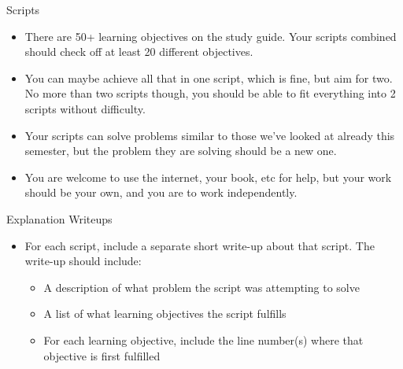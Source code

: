 \documentclass[pdf, aspectratio=169, 12pt]{beamer}
\begin{document}
\begin{frame}{Scripts}
	\begin{itemize}
		\item There are 50+ learning objectives on the study guide. Your scripts combined should check off at least 20 different objectives.
		\item You can maybe achieve all that in one script, which is fine, but aim for two. No more than two scripts though, you should be able to fit everything into 2 scripts without difficulty.
		\item Your scripts can solve problems similar to those we've looked at already this semester, but the problem they are solving should be a new one.
		\item You are welcome to use the internet, your book, etc for help, but your work should be your own, and you are to work independently.
	\end{itemize}
\end{frame}

\begin{frame}{Explanation Writeups}
	\begin{itemize}
		\item For each script, include a separate short write-up about that script. The write-up should include:
			\begin{itemize}
				\item A description of what problem the script was attempting to solve
				\item A list of what learning objectives the script fulfills
				\item For each learning objective, include the line number(s) where that objective is first fulfilled
			\end{itemize}
			
	\end{itemize}
	
\end{frame}




\end{document}
